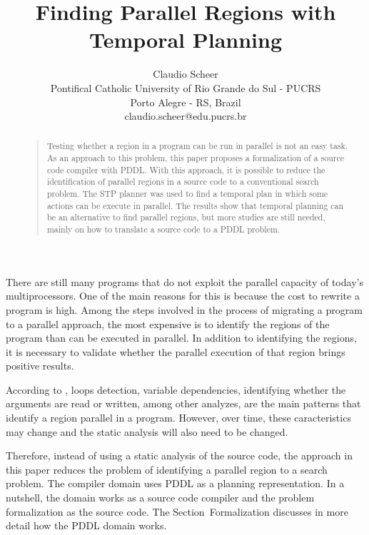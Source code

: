 \documentclass[letterpaper]{article}
\begin{document}
\title{Finding Parallel Regions with Temporal Planning}
\author{Claudio Scheer\\
    Pontifical Catholic University of Rio Grande do Sul - PUCRS\\
    Porto Alegre - RS, Brazil\\
    claudio.scheer@edu.pucrs.br\\
}
\maketitle

\begin{abstract}
    \begin{quote}
        Testing whether a region in a program can be run in parallel is not an easy task. As an approach to this problem, this paper proposes a formalization of a source code compiler with PDDL. With this approach, it is possible to reduce the identification of parallel regions in a source code to a conventional search problem. The STP planner was used to find a temporal plan in which some actions can be execute in parallel. The results show that temporal planning can be an alternative to find parallel regions, but more studies are still needed, mainly on how to translate a source code to a PDDL problem.
    \end{quote}
\end{abstract}

\noindent There are still many programs that do not exploit the parallel capacity of today's multiprocessors. One of the main reasons for this is because the cost to rewrite a program is high. Among the steps involved in the process of migrating a program to a parallel approach, the most expensive is to identify the regions of the program than can be executed in parallel. In addition to identifying the regions, it is necessary to validate whether the parallel execution of that region brings positive results.

According to \cite{doi:10.1177/1094342017695639}, loops detection, variable dependencies, identifying whether the arguments are read or written, among other analyzes, are the main patterns that identify a region parallel in a program. However, over time, these caracteristics may change and the static analysis will also need to be changed.

Therefore, instead of using a static analysis of the source code, the approach in this paper reduces the problem of identifying a parallel region to a search problem. The compiler domain uses PDDL as a planning representation. In a nutshell, the domain works as a source code compiler and the problem formalization as the source code. The Section~Formalization discusses in more detail how the PDDL domain works.
\end{document}
